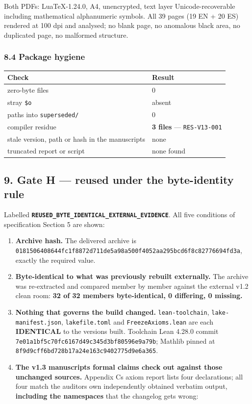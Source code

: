 \documentclass[
  9pt,
  a4paper,
]{article}
\newcounter{none} %
\providecommand{\tightlist}{%
  \setlength{\itemsep}{0pt}\setlength{\parskip}{0pt}}
\begin{document}
Both PDFs: LuaTeX-1.24.0, A4, unencrypted, text layer
Unicode-recoverable including mathematical alphanumeric symbols. All 39
pages (19 EN + 20 ES) rendered at 100 dpi and analysed; no blank page,
no anomalous black area, no duplicated page, no malformed structure.

\subsubsection{8.4 Package hygiene}\label{84-package-hygiene}

{\def\LTcaptype{none} %
\begin{longtable}[]{@{}ll@{}}
\toprule\noalign{}
Check & Result \\
\midrule\noalign{}
\endhead
\bottomrule\noalign{}
\endlastfoot
zero-byte files & 0 \\
stray \texttt{\$o} & absent \\
paths into \texttt{superseded/} & 0 \\
compiler residue & \textbf{3 files} --- \texttt{RES-V13-001} \\
stale version, path or hash in the manuscripts & none \\
truncated report or script & none found \\
\end{longtable}
}

\subsection{9. Gate H --- reused under the byte-identity
rule}\label{9-gate-h--reused-under-the-byte-identity-rule}

Labelled \textbf{\texttt{REUSED\_BYTE\_IDENTICAL\_EXTERNAL\_EVIDENCE}}.
All five conditions of specification Section 5 are shown:

\begin{enumerate}
\def\labelenumi{\arabic{enumi}.}
\tightlist
\item
  \textbf{Archive hash.} The delivered archive is
  \texttt{0181506408644fc1f8872d711de5a98a500f4052aa295bcd6f8c82776694fd3a},
  exactly the required value.
\item
  \textbf{Byte-identical to what was previously rebuilt externally.} The
  archive was re-extracted and compared member by member against the
  external v1.2 clean room: \textbf{32 of 32 members byte-identical, 0
  differing, 0 missing.}
\item
  \textbf{Nothing that governs the build changed.}
  \texttt{lean-toolchain}, \texttt{lake-manifest.json},
  \texttt{lakefile.toml} and \texttt{FreezeAxioms.lean} are each
  \textbf{IDENTICAL} to the versions built. Toolchain Lean 4.28.0 commit
  \texttt{7e01a1bf5c70fc6167d49c345d3bf80596e9a79b}; Mathlib pinned at
  \texttt{8f9d9cff6bd728b17a24e163c9402775d9e6a365}.
\item
  \textbf{The v1.3 manuscript\textquotesingle s formal claims check out
  against those unchanged sources.} Appendix C\textquotesingle s axiom
  report lists four declarations; all four match the
  auditor\textquotesingle s own independently obtained verbatim output,
  \textbf{including the namespaces} that the changelog gets wrong:
\end{enumerate}
\end{document}
